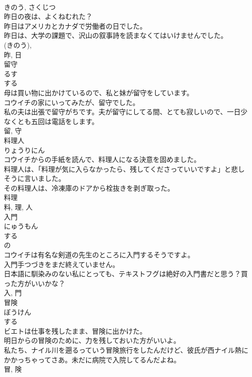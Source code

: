 \documentclass[8pt]{extreport}
\begin{document}
\begin{CJK}{UTF8}{min}
\\	きのう, さくじつ	
\\	昨日の夜は、よくねむれた？	
\\	昨日はアメリカとカナダで労働者の日でした。	
\\	昨日は、大学の課題で、沢山の叙事詩を読まなくてはいけませんでした。	
\\	(きのう), 
\\	昨, 日	
\\	留守	
\\	るす	
\\	する 
\\	母は買い物に出かけているので、私と妹が留守をしています。	
\\	コウイチの家にいってみたが、留守でした。	
\\	私の夫は出張で留守がちです。夫が留守にしてる間、とても寂しいので、一日少なくとも五回は電話をします。	
\\	留, 守	
\\	料理人	
\\	りょうりにん	
\\	コウイチからの手紙を読んで、料理人になる決意を固めました。	
\\	料理人は、「料理が気に入らなかったら、残してくださっていいですよ」と悲しそうに言いました。	
\\	その料理人は、冷凍庫のドアから栓抜きを剥ぎ取った。	
\\	料理 
\\	料, 理, 人	
\\	入門	
\\	にゅうもん	
\\	する 
\\	の 
\\	コウイチは有名な剣道の先生のところに入門するそうですよ。	
\\	入門手つづきをまだ終えていません。	
\\	日本語に馴染みのない私にとっても、テキストフグは絶好の入門書だと思う？買った方がいいかな？	
\\	入, 門	
\\	冒険	
\\	ぼうけん	
\\	する 
\\	ビエトは仕事を残したまま、冒険に出かけた。	
\\	明日からの冒険のために、力を残しておいた方がいいよ。	
\\	私たち、ナイル川を遡るっていう冒険旅行をしたんだけど、彼氏が西ナイル熱にかかっちゃってさあ。未だに病院で入院してるんだよね。	
\\	冒, 険	

\end{CJK}
\end{document}
